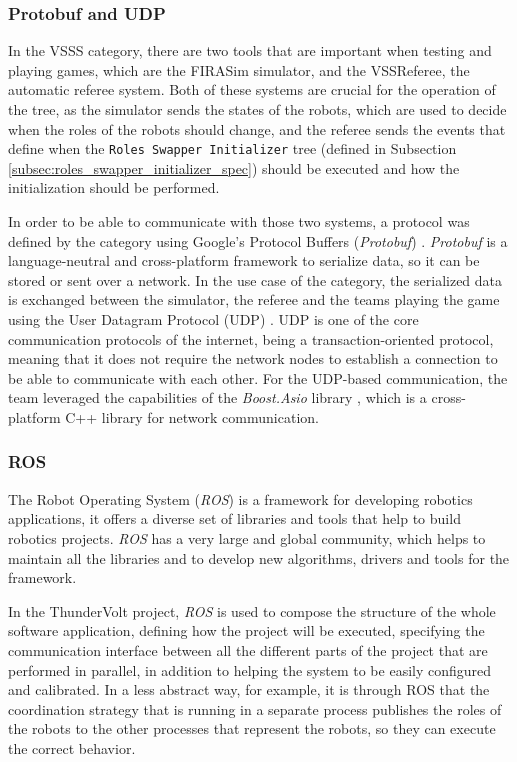 \subsubsection{Protobuf and UDP}

In the VSSS category, there are two tools that are important when testing and playing games, which are the FIRASim simulator, and the VSSReferee, the automatic referee system. Both of these systems are crucial for the operation of the tree, as the simulator sends the states of the robots, which are used to decide when the roles of the robots should change, and the referee sends the events that define when the \texttt{Roles Swapper Initializer} tree (defined in Subsection \ref{subsec:roles_swapper_initializer_spec}) should be executed and how the initialization should be performed.

In order to be able to communicate with those two systems, a protocol was defined by the category \cite{VSSProto} using Google's Protocol Buffers (\textit{Protobuf}) \cite{Protobuf}. \textit{Protobuf} is a language-neutral and cross-platform framework to serialize data, so it can be stored or sent over a network. In the use case of the category, the serialized data is exchanged between the simulator, the referee and the teams playing the game using the User Datagram Protocol (UDP) \cite{rfc768}. UDP is one of the core communication protocols of the internet, being a transaction-oriented protocol, meaning that it does not require the network nodes to establish a connection to be able to communicate with each other. For the UDP-based communication, the team leveraged the capabilities of the \textit{Boost.Asio} library \cite{BoostAsio}, which is a cross-platform C++ library for network communication.

\subsubsection{ROS}

The Robot Operating System (\textit{ROS}) \cite{ROS} is a framework for developing robotics applications, it offers a diverse set of libraries and tools that help to build robotics projects. \textit{ROS} has a very large and global community, which helps to maintain all the libraries and to develop new algorithms, drivers and tools for the framework.

In the ThunderVolt project, \textit{ROS} is used to compose the structure of the whole software application, defining how the project will be executed, specifying the communication interface between all the different parts of the project that are performed in parallel, in addition to helping the system to be easily configured and calibrated. In a less abstract way, for example, it is through ROS that the coordination strategy that is running in a separate process publishes the roles of the robots to the other processes that represent the robots, so they can execute the correct behavior.
